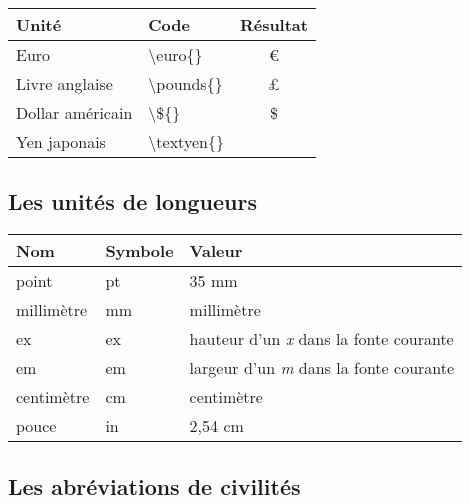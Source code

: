 \documentclass[a4paper,10pt]{article}
\begin{document}
\begin{center}%
\begin{tabular}{|l|l|c|}%
\hline%
\rowcolor{grisclair} \textbf{Unité} & \textbf{Code} & \textbf{Résultat} \\%
\hline%
Euro &  \textbackslash euro\{\} & \euro{} \\%
\hline%
Livre anglaise & \textbackslash pounds\{\} & \pounds{} \\%
\hline%
Dollar américain & \textbackslash \$\{\} & \${} \\%
\hline%
Yen japonais & \textbackslash textyen\{\} & \textyen{} \\%
\hline%
\end{tabular}%
\end{center}%

\subsection{Les unités de longueurs}%
\label{sub:unites_longueurs}

\begin{center}%
\begin{tabular}{|l|l|l|}%
\hline%
\rowcolor{grisclair} \textbf{Nom} & \textbf{Symbole} & \textbf{Valeur} \\%
\hline%
point &  pt & 35 mm \\%
\hline%
millimètre &  mm & millimètre \\%
\hline%
ex &  ex & hauteur d'un \emph{x} dans la fonte courante \\%
\hline%
em &  em & largeur d'un \emph{m} dans la fonte courante \\%
\hline%
centimètre & cm & centimètre \\%
\hline%
pouce & in & 2,54 cm \\%
\hline%
\end{tabular}%
\end{center}%


\subsection{Les abréviations de civilités}%
\label{sub:abreviations_civilites}
\end{document}

